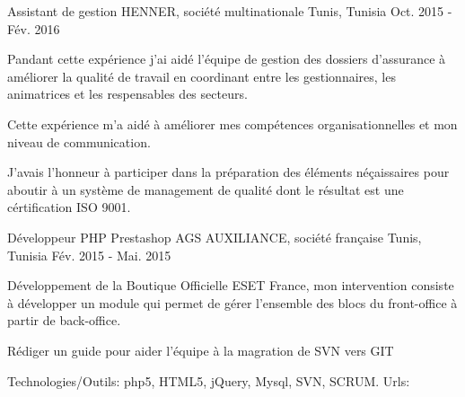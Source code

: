 \begin{cventries}
{    }
  \techentries
    {Assistant de gestion}
    {HENNER, société multinationale}
    {Tunis, Tunisia}
    {Oct. 2015 - Fév. 2016}
    {
      \begin{cvitems}
        \item {Pandant cette expérience j'ai aidé l'équipe de gestion des dossiers d'assurance à améliorer la qualité de travail en coordinant entre les gestionnaires, les animatrices et les respensables des secteurs.}
        \item {Cette expérience m'a aidé à améliorer mes compétences organisationnelles et mon niveau de communication.}
        \item {J'avais l'honneur à participer dans la préparation des éléments néçaissaires pour aboutir à un système de management de qualité dont le résultat est une cértification ISO 9001.}
      \end{cvitems}
    }
    {}{}{}
  \techentries
    {Développeur PHP Prestashop}
    {AGS AUXILIANCE, société française}
    {Tunis, Tunisia}
    {Fév. 2015 - Mai. 2015}
    {
      \begin{cvitems}
        \item {Développement de la Boutique Officielle ESET France, mon intervention consiste à développer un module qui permet  de gérer l'ensemble des blocs du front-office à partir de back-office.}
        \item {Rédiger un guide pour aider l'équipe à la magration de SVN vers GIT}
      \end{cvitems}
    }
    {\textcolor{awesome}{Technologies/Outils: } {\color{graytext}}  {php5, HTML5, jQuery, Mysql, SVN, SCRUM.}}
    {Urls:} 
    {\href{https://www.boutique-eset.com/}{} \break}
    { }\break
\end{cventries}